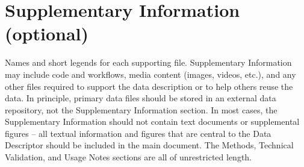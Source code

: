 \section{Supplementary Information (optional)}

Names and short legends for each supporting file.  Supplementary Information may include code and workflows, media content (images, videos, etc.), and any other files required to support the data description or to help others reuse the data.  In principle, primary data files should be stored in an external data repository, not the Supplementary Information section.  In most cases, the Supplementary Information should not contain text documents or supplemental figures – all textual information and figures that are central to the Data Descriptor should be included in the main document. The Methods, Technical Validation, and Usage Notes sections are all of unrestricted length. 
